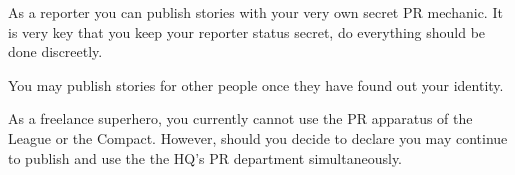 \documentclass[green]{LRSguildcamp1}
\begin{document}
\name{\gNewspaperPR{}}

As a reporter you can publish stories with your very own secret PR mechanic. It is very key that you keep your reporter status secret, do everything should be done discreetly. 

You may publish stories for other people once they have found out your identity. 






As a freelance superhero, you currently cannot use the PR apparatus of the League or the Compact. However, should you decide to declare you may continue to publish and use the the HQ's PR department simultaneously.  
\end{document}
